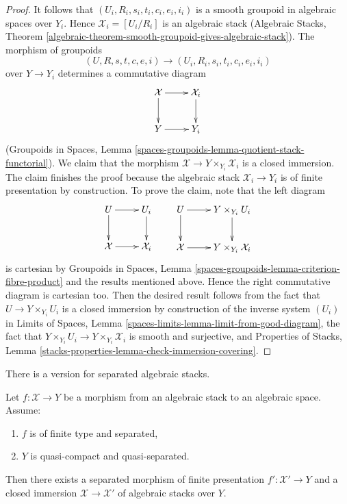 \begin{proof}
\medskip\noindent
It follows that $(U_i, R_i, s_i, t_i, c_i, e_i, i_i)$
is a smooth groupoid in algebraic spaces over $Y_i$.
Hence $\mathcal{X}_i = [U_i/R_i]$ is an algebraic stack
(Algebraic Stacks, Theorem
\ref{algebraic-theorem-smooth-groupoid-gives-algebraic-stack}).
The morphism of groupoids
$$
(U, R, s, t, c, e, i) \to (U_i, R_i, s_i, t_i, c_i, e_i, i_i)
$$
over $Y \to Y_i$ determines a commutative diagram
$$
\xymatrix{
\mathcal{X} \ar[d] \ar[r] & \mathcal{X}_i \ar[d] \\
Y \ar[r] & Y_i
}
$$
(Groupoids in Spaces, Lemma
\ref{spaces-groupoids-lemma-quotient-stack-functorial}).
We claim that the morphism $\mathcal{X} \to Y \times_{Y_i} \mathcal{X}_i$
is a closed immersion. The claim finishes the proof because
the algebraic stack $\mathcal{X}_i \to Y_i$ is of finite presentation
by construction. To prove the claim, note that the left diagram
$$
\xymatrix{
U \ar[d] \ar[r] & U_i \ar[d] \\
\mathcal{X} \ar[r] & \mathcal{X}_i
}
\quad\quad
\xymatrix{
U \ar[d] \ar[r] & Y \times_{Y_i} U_i \ar[d] \\
\mathcal{X} \ar[r] & Y \times_{Y_i} \mathcal{X}_i
}
$$
is cartesian by Groupoids in Spaces, Lemma
\ref{spaces-groupoids-lemma-criterion-fibre-product}
and the results mentioned above.
Hence the right commutative diagram is cartesian too.
Then the desired result follows from the fact that
$U \to Y \times_{Y_i} U_i$ is a closed immersion
by construction of the inverse system $(U_i)$ in
Limits of Spaces, Lemma \ref{spaces-limits-lemma-limit-from-good-diagram},
the fact that $Y \times_{Y_i} U_i \to Y \times_{Y_i} \mathcal{X}_i$
is smooth and surjective, and Properties of Stacks, Lemma
\ref{stacks-properties-lemma-check-immersion-covering}.
\end{proof}

\noindent
There is a version for separated algebraic stacks.

\begin{lemma}
\label{lemma-separated-closed-in-finite-presentation}
Let $f : \mathcal{X} \to Y$ be a morphism from an algebraic stack
to an algebraic space. Assume:
\begin{enumerate}
\item $f$ is of finite type and separated,
\item $Y$ is quasi-compact and quasi-separated.
\end{enumerate}
Then there exists a separated morphism of finite presentation
$f' : \mathcal{X}' \to Y$ and a closed immersion
$\mathcal{X} \to \mathcal{X}'$ of
algebraic stacks over $Y$.
\end{lemma}

